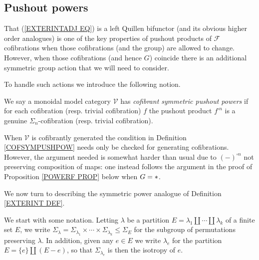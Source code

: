 \documentclass[a4paper,10pt]{article}%
\begin{document}
\subsection{Pushout powers}


That (\ref{EXTERINTADJ EQ}) is a left Quillen bifunctor (and its obvious higher order analogues) is one of the key properties of pushout products of $\mathcal{F}$ cofibrations when those cofibrations (and the group) are allowed to change. However, when those cofibrations (and hence $G$) coincide there is an additional symmetric group action that  we will need to consider.

To handle such actions we introduce the following notion.

\begin{definition}\label{COFSYMPUSHPOW}
	We say a monoidal model category $\mathcal{V}$ has 
	\textit{cofibrant symmetric pushout powers}
	if for each cofibration (resp. trivial cofibration) $f$ the pushout product 
	$f^{\square n}$ is a genuine $\Sigma_n$-cofibration (resp. trivial cofibration).
\end{definition}


\begin{remark}
When $\mathcal{V}$ is cofibrantly generated
the condition in Definition \ref{COFSYMPUSHPOW} needs only be checked for generating cofibrations. 
However, the argument needed is somewhat harder than usual due to $(-)^{\square n}$ not preserving composition of maps:
one instead follows the argument in the proof of 
Proposition \ref{POWERF PROP} below when $G=\**$.
\end{remark}




We now turn to describing the symmetric power analogue of 
Definition \ref{EXTERINT DEF}.

We start with some notation. Letting 
$\lambda$ be a partition 
$E = \lambda_1 \amalg\cdots \amalg \lambda_k$
of a finite set $E$, 
we write 
 $\Sigma_{\lambda} = \Sigma_{\lambda_1} \times \cdots \times
 \Sigma_{\lambda_k} \leq \Sigma_E$ for the subgroup of permutations preserving $\lambda$. 
 In addition, given any $e \in E$ we write
$\lambda_e$ for the partition $E = \{e\} \amalg (E-e)$, so that $\Sigma_{\lambda_e}$ is then the isotropy of $e$.
\end{document}
